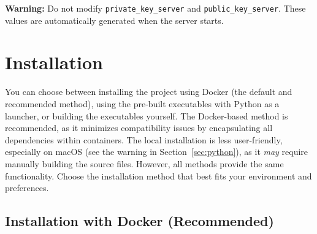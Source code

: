 \noindent
\begin{myWarning}
\textbf{Warning:} Do not modify \texttt{private\_key\_server} and \texttt{public\_key\_server}. These values are automatically generated when the server starts.
\end{myWarning}

\section{Installation}

You can choose between installing the project using Docker (the default and recommended method), using the pre-built executables with Python as a launcher, or building the executables yourself.  
The Docker-based method is recommended, as it minimizes compatibility issues by encapsulating all dependencies within containers.  
The local installation is less user-friendly, especially on macOS (see the warning in Section~\ref{sec:python}), as it \textit{may} require manually building the source files.  
However, all methods provide the same functionality. Choose the installation method that best fits your environment and preferences.

\subsection{Installation with Docker (Recommended)}
\label{sec:docker}

